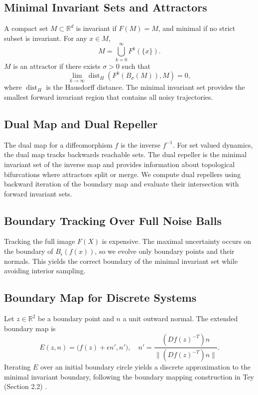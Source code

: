 \documentclass[11pt,twocolumn]{article}
\begin{document}
\subsection{Minimal Invariant Sets and Attractors}
A compact set $M \subset \mathbb{R}^d$ is invariant if $F(M) = M$, and minimal if no strict subset is invariant. For any $x \in M$,
\begin{equation}
M = \bigcup_{k=0}^{\infty} F^k(\{x\}).
\end{equation}
$M$ is an attractor if there exists $\sigma > 0$ such that
\begin{equation}
\lim_{k \to \infty} \operatorname{dist}_H(F^k(B_{\sigma}(M)), M) = 0,
\end{equation}
where $\operatorname{dist}_H$ is the Hausdorff distance. The minimal invariant set provides the smallest forward invariant region that contains all noisy trajectories.

\subsection{Dual Map and Dual Repeller}
The dual map for a diffeomorphism $f$ is the inverse $f^{-1}$. For set valued dynamics, the dual map tracks backwards reachable sets. The dual repeller is the minimal invariant set of the inverse map and provides information about topological bifurcations where attractors split or merge. We compute dual repellers using backward iteration of the boundary map and evaluate their intersection with forward invariant sets.

\subsection{Boundary Tracking Over Full Noise Balls}
Tracking the full image $F(X)$ is expensive. The maximal uncertainty occurs on the boundary of $B_{\epsilon}(f(x))$, so we evolve only boundary points and their normals. This yields the correct boundary of the minimal invariant set while avoiding interior sampling.

\subsection{Boundary Map for Discrete Systems}
Let $z \in \mathbb{R}^2$ be a boundary point and $n$ a unit outward normal. The extended boundary map is
\begin{equation}
E(z,n) = \bigl(f(z) + \epsilon n', n'\bigr), \quad
n' = \frac{(Df(z)^{-T}) n}{\|(Df(z)^{-T}) n\|}.
\end{equation}
Iterating $E$ over an initial boundary circle yields a discrete approximation to the minimal invariant boundary, following the boundary mapping construction in Tey (Section 2.2) \cite{tey2023}.
\end{document}
